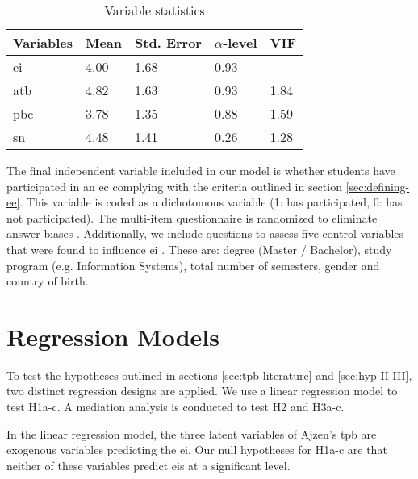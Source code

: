 \begin{table}[H]
\centering
\caption{Variable statistics}
\label{var}
\begin{tabular}{@{}lllll@{}}
\toprule
Variables & Mean & Std. Error & $\alpha$-level & VIF \\ 
\midrule
\ac{ei} & 4.00 & 1.68 & 0.93 \\
\ac{atb} & 4.82  & 1.63 & 0.93 & 1.84  \\
\ac{pbc} & 3.78  & 1.35 & 0.88 & 1.59 \\
\ac{sn} & 4.48  & 1.41 &  0.26 & 1.28 \\ \bottomrule 
\end{tabular}
\end{table} 

The final independent variable included in our model is whether students have participated in an \ac{ec} complying with the criteria outlined in section \ref{sec:defining-ee}. This variable is coded as a dichotomous variable (1: has participated, 0: has not participated). The multi-item questionnaire is randomized to eliminate answer biases \citep{warner1965randomized}. Additionally, we include questions to assess five control variables that were found to influence \ac{ei} \citep{lorz2011impact,oosterbeek2010impact,pittaway2007entrepreneurship,solesvik2013entrepreneurial}. These are: degree (Master / Bachelor), study program (e.g. Information Systems), total number of semesters, gender and country of birth.  

\section{Regression Models}
To test the hypotheses outlined in sections \ref{sec:tpb-literature} and \ref{sec:hyp-II-III}, two distinct regression designs are applied. We use a linear regression model to test H1a-c. A mediation analysis is conducted to test H2 and H3a-c.

In the linear regression model, the three latent variables of Ajzen's \ac{tpb} are exogenous variables predicting the \ac{ei}. Our null hypotheses for H1a-c are that neither of these variables predict \acp{ei} at a significant level.

